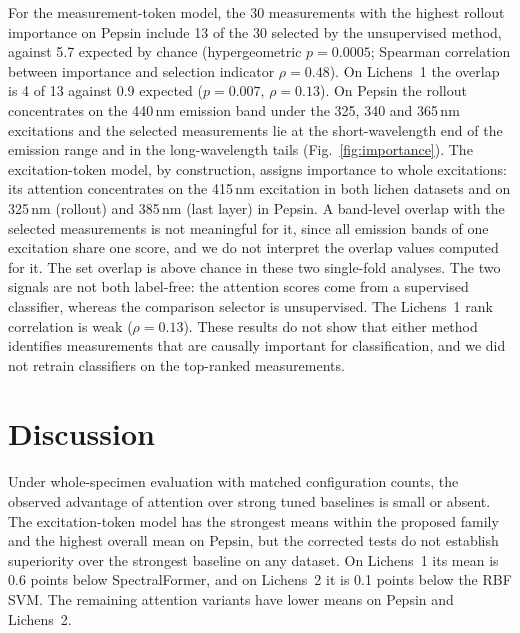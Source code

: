 \documentclass[journal]{IEEEtran}
\begin{document}
For the measurement-token model, the 30 measurements with the highest rollout importance on Pepsin include 13 of the 30 selected by the unsupervised method, against 5.7 expected by chance (hypergeometric $p=0.0005$; Spearman correlation between importance and selection indicator $\rho=0.48$). On Lichens~1 the overlap is 4 of 13 against 0.9 expected ($p=0.007$, $\rho=0.13$). On Pepsin the rollout concentrates on the 440\,nm emission band under the 325, 340 and 365\,nm excitations and the selected measurements lie at the short-wavelength end of the emission range and in the long-wavelength tails (Fig.~\ref{fig:importance}). The excitation-token model, by construction, assigns importance to whole excitations: its attention concentrates on the 415\,nm excitation in both lichen datasets and on 325\,nm (rollout) and 385\,nm (last layer) in Pepsin. A band-level overlap with the selected measurements is not meaningful for it, since all emission bands of one excitation share one score, and we do not interpret the overlap values computed for it. The set overlap is above chance in these two single-fold analyses. The two signals are not both label-free: the attention scores come from a supervised classifier, whereas the comparison selector is unsupervised. The Lichens~1 rank correlation is weak ($\rho=0.13$). These results do not show that either method identifies measurements that are causally important for classification, and we did not retrain classifiers on the top-ranked measurements.

\section{Discussion}
Under whole-specimen evaluation with matched configuration counts, the observed advantage of attention over strong tuned baselines is small or absent. The excitation-token model has the strongest means within the proposed family and the highest overall mean on Pepsin, but the corrected tests do not establish superiority over the strongest baseline on any dataset. On Lichens~1 its mean is 0.6 points below SpectralFormer, and on Lichens~2 it is 0.1 points below the RBF SVM. The remaining attention variants have lower means on Pepsin and Lichens~2.
\end{document}

